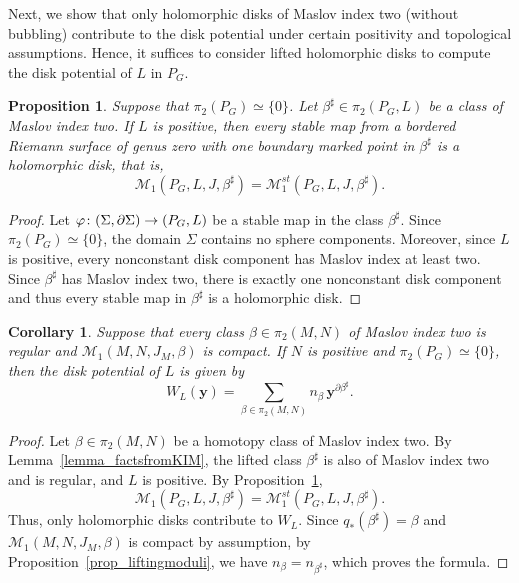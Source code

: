 \documentclass[11pt]{amsart}
\theoremstyle{plain}
\newtheorem{proposition}[theorem]{Proposition}
\newtheorem{corollary}[theorem]{Corollary}
\theoremstyle{definition}
\theoremstyle{remark}
\numberwithin{equation}{section} \numberwithin{table}{section}
\def\to{\mathchoice{\longrightarrow}{\rightarrow}{\rightarrow}{\rightarrow}}
\numberwithin{equation}{section}
\begin{document}
Next, we show that only holomorphic disks of Maslov index two (without bubbling) contribute  to the disk potential under certain positivity and topological assumptions. Hence, it suffices to consider lifted holomorphic disks to compute the disk potential of $L$ in $P_G$. 

\begin{proposition}\label{proposition_maina}
Suppose that $\pi_2(P_G) \simeq \{0\}$. Let $\beta^\sharp \in \pi_2(P_G,L)$ be a class of Maslov index two. If $L$ is positive, then every stable map from a bordered Riemann surface of genus zero with one boundary marked point in $\beta^\sharp$ is a holomorphic disk, that is, 
$$
\mathcal{M}_1(P_G, L, J, \beta^\sharp) = \mathcal{M}^{st}_1(P_G, L, J, \beta^\sharp).
$$
\end{proposition}

\begin{proof}
Let $\varphi \colon (\Sigma, \partial \Sigma) \to (P_G, L)$ be a stable map in the class $\beta^\sharp$. Since $\pi_2(P_G) \simeq \{0\}$, the domain $\Sigma$ contains no sphere components. Moreover, since $L$ is positive, every nonconstant disk component has Maslov index at least two. Since $\beta^\sharp$ has Maslov index two, there is exactly one nonconstant disk component and thus every stable map in $\beta^\sharp$ is a holomorphic disk.
\end{proof}

\begin{corollary}\label{cor_diskposreg}
Suppose that every class $\beta \in \pi_2(M,N)$ of Maslov index two is regular and $\mathcal{M}_1(M,N,J_M,\beta)$ is compact. If $N$ is positive and $\pi_2(P_G) \simeq \{0\}$, then the disk potential of $L$ is given by
$$
W_L (\mathbf{y}) = \sum_{\beta \in \pi_2(M,N)} n_\beta \, \mathbf{y}^{\partial \beta^\sharp}.
$$
\end{corollary}

\begin{proof}
Let $\beta \in \pi_2(M,N)$ be a homotopy class of Maslov index two. By Lemma~\ref{lemma_factsfromKIM}, the lifted class $\beta^\sharp$ is also of Maslov index two and is regular, and $L$ is positive. By Proposition~\ref{proposition_maina}, 
$$
\mathcal{M}_1(P_G, L, J, \beta^\sharp) = \mathcal{M}^{st}_1(P_G, L, J, \beta^\sharp).
$$ 
Thus, only holomorphic disks contribute to $W_L$. Since $q_* (\beta^\sharp) = \beta$ and $\mathcal{M}_1(M, N, J_M, \beta)$ is compact by assumption, by Proposition~\ref{prop_liftingmoduli}, we have $n_\beta = n_{\beta^\sharp}$, which proves the formula.
\end{proof}
\end{document}
